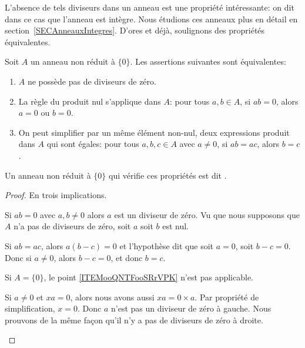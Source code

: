 L'absence de tels diviseurs dans un anneau est une propriété intéressante: on dit dans ce cas que l'anneau est intègre. Nous étudions ces anneaux plus en détail en section~\ref{SECAnneauxIntegres}. D'ores et déjà, soulignons des propriétés équivalentes.

\begin{propositionDef}           \label{DEFooTAOPooWDPYmd}
    Soit $A$ un anneau non réduit à \( \{ 0 \}\). Les assertions suivantes sont équivalentes:
    \begin{enumerate}
        \item       \label{ITEMooMXMKooXMYpkN}
            \( A\) ne possède pas de diviseurs de zéro.
        \item       \label{ITEMooLAJCooFwxXrV}
            La règle du produit nul s'applique dans $A$: pour tous \( a, b \in A \), si \( ab=0\), alors \( a = 0\) ou \( b = 0\).
        \item       \label{ITEMooQNTFooSRrVPK}
            On peut simplifier par un même élément non-nul, deux expressions produit dans $A$ qui sont égales: pour tous \( a, b, c \in A \) avec \( a \neq 0 \), si \( ab = ac \), alors \( b = c \).
    \end{enumerate}
    Un anneau non réduit à \( \{ 0 \}\) qui vérifie ces propriétés est dit .
\end{propositionDef}

\begin{proof}
    En trois implications.
    \begin{subproof}
        \item[\ref{ITEMooMXMKooXMYpkN} implique \ref{ITEMooLAJCooFwxXrV}]

            Si \( ab=0\) avec \( a,b\neq 0\) alors \( a\) est un diviseur de zéro. Vu que nous supposons que \( A\) n'a pas de diviseurs de zéro, soit \( a\) soit \( b\) est nul.
        \item[\ref{ITEMooLAJCooFwxXrV} implique \ref{ITEMooQNTFooSRrVPK}]

            Si \( ab=ac\), alors \( a(b-c)=0\) et l'hypothèse dit que soit \( a=0\), soit \( b-c=0\). Donc si \( a\neq 0\), alors \( b-c=0\), et donc \( b = c \).
        \item[\ref{ITEMooQNTFooSRrVPK} implique \ref{ITEMooMXMKooXMYpkN}]
            Si \( A=\{ 0 \}\), le point \ref{ITEMooQNTFooSRrVPK} n'est pas applicable.

            Si \( a\neq 0\) et \( xa=0\), alors nous avons aussi \( xa=0\times a\). Par propriété de simplification, \( x=0\). Donc \( a\) n'est pas un diviseur de zéro à gauche. Nous prouvons de la même façon qu'il n'y a pas de diviseurs de zéro à droite.
    \end{subproof}
\end{proof}


